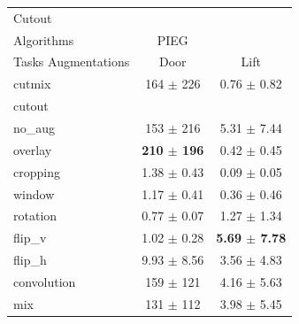 \begin{tabular}{lcc}
Cutout & & \\
Algorithms & PIEG & \\
Tasks Augmentations & Door & Lift \\
cutmix          & 164 $\pm$ 226 & 0.76 $\pm$ 0.82 \\
cutout          &  &  \\
no\_aug         & 153 $\pm$ 216 & 5.31 $\pm$ 7.44 \\
overlay         & \textbf{210 $\pm$ 196} & 0.42 $\pm$ 0.45 \\
cropping        & 1.38 $\pm$ 0.43 & 0.09 $\pm$ 0.05 \\
window          & 1.17 $\pm$ 0.41 & 0.36 $\pm$ 0.46 \\
rotation        & 0.77 $\pm$ 0.07 & 1.27 $\pm$ 1.34 \\
flip\_v         & 1.02 $\pm$ 0.28 & \textbf{5.69 $\pm$ 7.78} \\
flip\_h         & 9.93 $\pm$ 8.56 & 3.56 $\pm$ 4.83 \\
convolution     & 159 $\pm$ 121 & 4.16 $\pm$ 5.63 \\
mix             & 131 $\pm$ 112 & 3.98 $\pm$ 5.45 \\
\end{tabular}